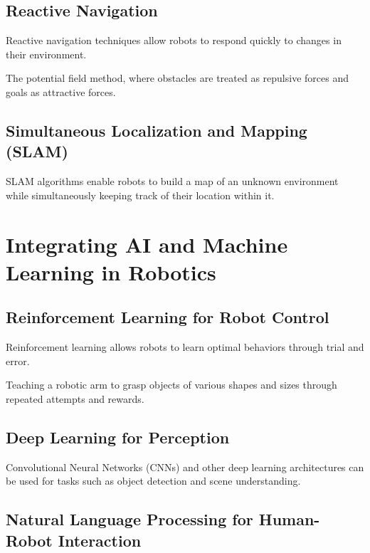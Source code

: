 \documentclass[
]{article}
\begin{document}
\subsection{Reactive Navigation}

Reactive navigation techniques allow robots to respond quickly to
changes in their environment.

\begin{example}
The potential field method, where obstacles are treated as repulsive forces and goals as attractive forces.
\end{example}

\subsection{Simultaneous Localization and Mapping (SLAM)}

SLAM algorithms enable robots to build a map of an unknown environment
while simultaneously keeping track of their location within it.

\section{Integrating AI and Machine Learning in Robotics}

\subsection{Reinforcement Learning for Robot Control}

Reinforcement learning allows robots to learn optimal behaviors through
trial and error.

\begin{example}
Teaching a robotic arm to grasp objects of various shapes and sizes through repeated attempts and rewards.
\end{example}

\subsection{Deep Learning for Perception}

Convolutional Neural Networks (CNNs) and other deep learning
architectures can be used for tasks such as object detection and scene
understanding.

\subsection{Natural Language Processing for Human-Robot Interaction}
\end{document}
